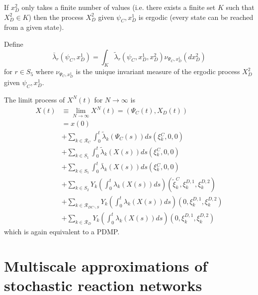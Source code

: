 \documentclass[english]{article}
\begin{document}
If $x_{D}^{2}$ only takes a finite number of values (i.e. there exists
a finite set $K$ such that $X_{D}^{2} \in K$) then the process
$X_{D}^{2}$ given $\psi_{C}, x_{D}^{1}$ is ergodic (every state can
be reached from a given state).

Define
\[
    \bar{\lambda}_{r} \left( \psi_{C}, x_{D}^{1} \right) = 
        \int_{K} \tilde{\lambda}_{r} \left(
            \psi_{C}, x_{D}^{1}, x_{D}^{2}
        \right) \nu_{\Psi_{C}, x_{D}^{1}} \left( dx_{D}^{2} \right)
\]
for $r \in S_{5}$ where $\nu_{\Psi_{C}, x_{D}^{1}}$ is the unique
invariant measure of the ergodic process $X_{D}^{2}$ given
$\psi_{C}, x_{D}^{1}$.

\begin{theorem}
\label{theo:theorem_convergence_averaging}
The limit process of $X^{N}(t)$ for $N\rightarrow\infty$ is
\begin{align*}
    X(t) &
        \equiv \underset{N \rightarrow \infty}{\lim}
			X^{N}(t)
		= \left( \Psi_{C}(t), X_{D}(t) \right) \\
    & = x(0) \\
    & + \sum_{k \in \mathcal{R}_{C}} \int_{0}^{t}
		\tilde{\lambda}_{k} \left( \Psi_{C}(s) \right) ds
			\left( \xi{}_{k}^{C}, 0, 0 \right) \\
    & + \sum_{k \in S_{1}} \int_{0}^{t} \tilde{\lambda}_{k}
		\left( X(s) \right) ds \left( \xi{}_{k}^{C}, 0, 0 \right) \\
    & + \sum_{k \in S_{5}} \int_{0}^{t} \bar{\lambda}_{k}
		\left( X(s) \right) ds \left( \xi{}_{k}^{C}, 0, 0 \right) \\
    & + \sum_{k \in S_{2}} Y_{k} \left( \int_{0}^{t} \lambda_{k}
		\left( X(s) \right) ds \right) \left(
			\tilde{\xi}_{k}^{C}, \xi_{k}^{D,1}, \xi_{k}^{D,2}
		\right) \\
    & + \sum_{k \in \mathcal{R}_{DC \backslash S}} Y_{k} \left(
		\int_{0}^{t} \lambda_{k} \left( X(s) \right) ds \right)
		\left( 0, \xi_{k}^{D,1}, \xi_{k}^{D,2} \right) \\
    & + \sum_{k \in \mathcal{R}_{D}} Y_{k} \left( \int_{0}^{t}
		\lambda_{k} \left( X(s) \right) ds \right)
		\left( 0, \xi_{k}^{D,1}, \xi_{k}^{D,2} \right)
\end{align*}
which is again equivalent to a PDMP.
\end{theorem}


\section{Multiscale approximations of stochastic reaction networks}
\end{document}
